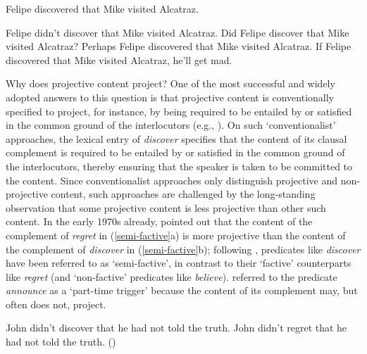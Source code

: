\documentclass[11pt,fleqn]{article}
\newcommand{\6}{\mbox{$[\hspace*{-.6mm}[$}}
\newcommand{\9}{\mbox{$]\hspace*{-.6mm}]$}}
\begin{document}
\begin{exe}
\ex\label{eng1}  Felipe discovered that Mike visited Alcatraz.

\ex\label{eng2}
\begin{xlist} 
\ex Felipe didn't discover that Mike visited Alcatraz.
\ex Did Felipe discover that Mike visited Alcatraz?
\ex Perhaps Felipe discovered that Mike visited Alcatraz.
\ex If Felipe discovered that Mike visited Alcatraz, he'll get mad.
\end{xlist}
\end{exe}

Why does projective content project? One of the most successful and widely adopted answers to this question is that projective content is conventionally specified to project, for instance, by being required to be entailed by or satisfied in the common ground of the interlocutors (e.g., \citealt{heim83,vds92,geurts99}). On such `conventionalist' approaches, the lexical entry of {\em discover} specifies that the content of its clausal complement is required to be entailed by or satisfied in the common ground of the interlocutors, thereby ensuring that the speaker is taken to be committed to the content. Since conventionalist approaches only distinguish projective and non-projective content, such approaches are challenged by the long-standing observation that some projective content is less projective than other such content. In the early 1970s already, \citet{karttunen71b} pointed out that the content of the complement of {\em regret} in (\ref{semi-factive}a) is more projective than the content of the complement of {\em discover} in (\ref{semi-factive}b); following \citealt{karttunen71b}, predicates like {\em discover} have been referred to as `semi-factive', in contrast to their `factive' counterparts like {\em regret} (and `non-factive' predicates like {\em believe}). \citet{schlenker10} referred to the predicate {\em announce} as a `part-time trigger' because the content of its complement may, but often does not, project.

\begin{exe}
\ex\label{semi-factive}
\begin{xlist}
\ex John didn't discover that he had not told the truth.  
\ex John didn't regret that he had not told the truth.
\hfill (\citealt[63]{karttunen71b})

\end{xlist}
\end{exe}
\end{document}
